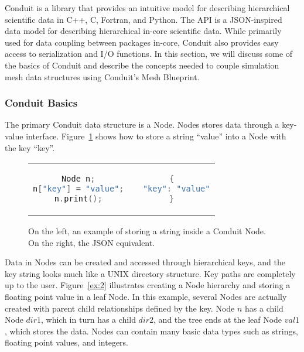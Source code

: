 Conduit is a library that provides an intuitive model for describing
hierarchical scientific data in C++, C, Fortran, and Python.
%
The API is a JSON-inspired data model for describing hierarchical
in-core scientific data.
%
While primarily used for data coupling between packages in-core,
Conduit also provides easy access to serialization and I/O functions.
%
In this section, we will discuss some of the basics of Conduit
and describe the concepts needed to couple simulation mesh
data structures using Conduit's Mesh Blueprint.


\subsubsection{Conduit Basics}
The primary Conduit data structure is a Node.
%
Nodes stores data through a key-value interface.
%
Figure~\ref{ex:1} shows how to store a string ``value'' into a Node
with the key ``key''.

\begin{figure}
\begin{tabular}{cc}
  \begin{minipage}{.5\textwidth}
  \centering
    \begin{lstlisting}[language=C++]
Node n;
n["key"] = "value";
n.print();
    \end{lstlisting}
  \end{minipage}
  &
  \begin{minipage}{.5\textwidth}
  \centering
  \begin{lstlisting}[language=C++]
{
  "key": "value"
}
  \end{lstlisting}
  \end{minipage}
\end{tabular}
\caption{\label{ex:1}On the left, an example of storing a string inside a Conduit Node. On the right, the JSON equivalent.}
\end{figure}

Data in Nodes can be created and accessed through hierarchical keys,
and the key string looks much like a UNIX directory structure.
%
Key paths are completely up to the user.
%
Figure~\ref{ex:2} illustrates creating a Node hierarchy
and storing a floating point value in a leaf Node.
%
In this example, several Nodes are actually created with parent child
relationships defined by the key.
%
Node $n$ has a child Node $dir1$, which in turn has a child $dir2$,
and the tree ends at the leaf Node $val1$, which stores the data.
%
Nodes can contain many basic data types such as strings,
floating point values, and integers.

